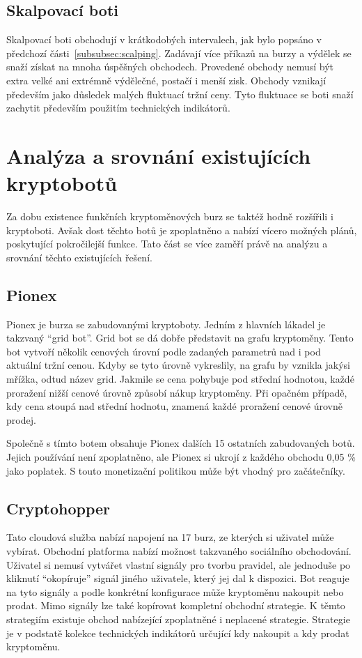 \subsection{Skalpovací boti}
Skalpovací boti obchodují v krátkodobých intervalech, jak bylo popsáno v předchozí části~\ref{subsubsec:scalping}. Zadávají více příkazů na burzy a výdělek se snaží
získat na mnoha úspěšných obchodech. Provedené obchody nemusí být extra velké ani extrémně výdělečné, postačí i menší zisk. Obchody vznikají především jako důsledek
malých fluktuací tržní ceny. Tyto fluktuace se boti snaží zachytit především použitím technických indikátorů.


\section{Analýza a srovnání existujících kryptobotů}
Za dobu existence funkčních kryptoměnových burz se taktéž hodně rozšířili i kryptoboti. Avšak dost těchto botů je zpoplatněno a nabízí vícero možných plánů, poskytující
pokročilejší funkce. Tato část se více zaměří právě na analýzu a srovnání těchto existujících řešení.

\subsection{Pionex}
Pionex je burza se zabudovanými kryptoboty. Jedním z hlavních lákadel je takzvaný \enquote{grid bot}. Grid bot se dá dobře představit na grafu kryptoměny. Tento bot
vytvoří několik cenových úrovní podle zadaných parametrů nad i pod aktuální tržní cenou. Kdyby se tyto úrovně vykreslily, na grafu by vznikla jakýsi mřížka, odtud název
grid. Jakmile se cena pohybuje pod střední hodnotou, každé proražení nižší cenové úrovně způsobí nákup kryptoměny. Při opačném případě, kdy cena stoupá nad střední hodnotu,
znamená každé proražení cenové úrovně prodej.

Společně s tímto botem obsahuje Pionex dalších 15 ostatních zabudovaných botů. Jejich používání není zpoplatněno, ale Pionex si ukrojí z každého obchodu 0,05 \% jako poplatek.
S touto monetizační politikou může být vhodný pro začátečníky.

\subsection{Cryptohopper}
Tato cloudová služba nabízí napojení na 17 burz, ze kterých si uživatel může vybírat. Obchodní platforma nabízí možnost takzvaného sociálního obchodování. Uživatel si
nemusí vytvářet vlastní signály pro tvorbu pravidel, ale jednoduše po kliknutí \enquote{okopíruje} signál jiného uživatele, který jej dal k dispozici. Bot reaguje na tyto
signály a podle konkrétní konfigurace může kryptoměnu nakoupit nebo prodat. Mimo signály lze také kopírovat kompletní obchodní strategie. K těmto strategiím existuje
obchod nabízející zpoplatněné i neplacené strategie. Strategie je v podstatě kolekce technických indikátorů určující kdy nakoupit a kdy prodat kryptoměnu.

